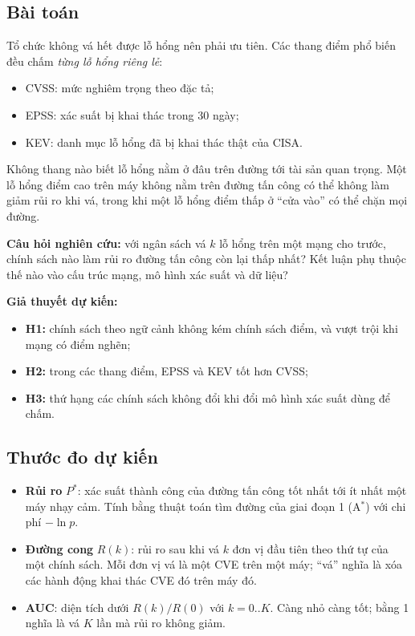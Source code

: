 \documentclass[11pt,a4paper]{article}
\newcommand{\Ps}{P^{*}}
\begin{document}
\subsection{Bài toán}

Tổ chức không vá hết được lỗ hổng nên phải ưu tiên. Các thang điểm phổ biến đều chấm \emph{từng lỗ hổng riêng lẻ}:
\begin{itemize}
  \item CVSS: mức nghiêm trọng theo đặc tả;
  \item EPSS: xác suất bị khai thác trong 30 ngày;
  \item KEV: danh mục lỗ hổng đã bị khai thác thật của CISA.
\end{itemize}
Không thang nào biết lỗ hổng nằm ở đâu trên đường tới tài sản quan trọng. Một lỗ hổng điểm cao trên máy không nằm trên đường tấn công có thể không làm giảm rủi ro khi vá, trong khi một lỗ hổng điểm thấp ở ``cửa vào'' có thể chặn mọi đường.

\textbf{Câu hỏi nghiên cứu:} với ngân sách vá $k$ lỗ hổng trên một mạng cho trước, chính sách nào làm rủi ro đường tấn công còn lại thấp nhất? Kết luận phụ thuộc thế nào vào cấu trúc mạng, mô hình xác suất và dữ liệu?

\textbf{Giả thuyết dự kiến:}
\begin{itemize}
  \item \textbf{H1:} chính sách theo ngữ cảnh không kém chính sách điểm, và vượt trội khi mạng có điểm nghẽn;
  \item \textbf{H2:} trong các thang điểm, EPSS và KEV tốt hơn CVSS;
  \item \textbf{H3:} thứ hạng các chính sách không đổi khi đổi mô hình xác suất dùng để chấm.
\end{itemize}

\subsection{Thước đo dự kiến}

\begin{itemize}
  \item \textbf{Rủi ro} $\Ps$: xác suất thành công của đường tấn công tốt nhất tới ít nhất một máy nhạy cảm. Tính bằng thuật toán tìm đường của giai đoạn 1 (A$^{*}$) với chi phí $-\ln p$.
  \item \textbf{Đường cong} $R(k)$: rủi ro sau khi vá $k$ đơn vị đầu tiên theo thứ tự của một chính sách. Mỗi đơn vị vá là một CVE trên một máy; ``vá'' nghĩa là xóa các hành động khai thác CVE đó trên máy đó.
  \item \textbf{AUC}: diện tích dưới $R(k)/R(0)$ với $k = 0..K$. Càng nhỏ càng tốt; bằng 1 nghĩa là vá $K$ lần mà rủi ro không giảm.
\end{itemize}
\end{document}
